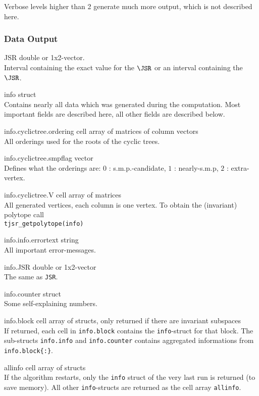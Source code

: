 Verbose levels higher than 2 generate much more output, which is not described here.

\subsubsection{Data Output}
\begin{param}
\item[JSR] double or 1x2-vector.\\Interval containing the exact value for the $\JSR$ or an interval containing the $\JSR$.
\item[info] struct\\ Contains nearly all data which was generated during the computation. Most important fields are described here, all other fields are described below.
    \begin{param}
    \item[info.cyclictree.ordering]    cell array of matrices of column vectors\\
    All orderings used for the roots of the cyclic trees.
    
    \item[info.cyclictree.smpflag] vector\\
    Defines what the orderings are: $0$ : s.m.p.-candidate, $1$ : nearly-s.m.p, $2$ : extra-vertex.
    
    \item[info.cyclictree.V] cell array of matrices\\All generated vertices, each column is one vertex. To obtain the (invariant) polytope call\\
    \texttt{tjsr\_getpolytope(info)}
    
    \item[info.info.errortext] string\\All important error-messages.
    
    \item[info.JSR] double or 1x2-vector\\The same as \texttt{JSR}.
    \item[info.counter] struct\\Some self-explaining numbers.
    \item[info.block] cell array of structs, only returned if there are invariant subspaces\\
    If returned, each cell in \texttt{info.block} contains the \texttt{info}-struct for that block.
    The sub-structs \texttt{info.info} and \texttt{info.counter} contains aggregated informations from \texttt{info.block\{:\}}.
    \end{param}

\item[allinfo] cell array of structs\\
If the algorithm restarts, only the \texttt{info} struct of the very last run is returned (to save memory). All other \texttt{info}-structs are returned as the cell array \texttt{allinfo}.
\end{param}

